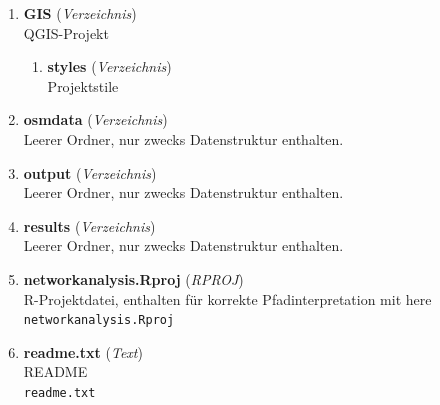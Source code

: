 \begin{enumerate}[label=\arabic*., leftmargin=*, itemsep=0.5em, topsep=0.3em]
\begin{enumerate}[label=\arabic{enumi}.\arabic*, leftmargin=*, itemsep=0.5em, topsep=0.3em]
\texttt{\small geodata/regbez10kmbuffer.geojson}
\item \textbf{regbez25kmbuffer.geojson} \textnormal{(\textit{GeoJSON})}\\
Untersuchungsgebiet mit 25 km Puffer (VG250)\\
\texttt{\small geodata/regbez25kmbuffer.geojson}
\item \textbf{zensus.gpkg} \textnormal{(\textit{GeoPackage})}\\
Zensusgitter (bewohnte Zellen)\\
\texttt{\small geodata/zensus.gpkg}
\begin{enumerate}[label=\arabic{enumi}.\arabic{enumii}.\arabic*, leftmargin=*, itemsep=0.5em, topsep=0.3em]
\item \textbf{regbez\_zensus\_populated} \textnormal{(\textit{Layer})}
\item \textbf{regbez\_zensus\_populated\_25km} \textnormal{(\textit{Layer})}
\end{enumerate}
\end{enumerate}
\item \textbf{GIS} \textnormal{(\textit{Verzeichnis})}\\
QGIS-Projekt
\begin{enumerate}[label=\arabic{enumi}.\arabic*, leftmargin=*, itemsep=0.5em, topsep=0.3em]
\item \textbf{styles} \textnormal{(\textit{Verzeichnis})}\\
Projektstile
\end{enumerate}
\item \textbf{osmdata} \textnormal{(\textit{Verzeichnis})}\\
Leerer Ordner, nur zwecks Datenstruktur enthalten.
\item \textbf{output} \textnormal{(\textit{Verzeichnis})}\\
Leerer Ordner, nur zwecks Datenstruktur enthalten.
\item \textbf{results} \textnormal{(\textit{Verzeichnis})}\\
Leerer Ordner, nur zwecks Datenstruktur enthalten.
\item \textbf{networkanalysis.Rproj} \textnormal{(\textit{RPROJ})}\\
R-Projektdatei, enthalten für korrekte Pfadinterpretation mit here\\
\texttt{\small networkanalysis.Rproj}
\item \textbf{readme.txt} \textnormal{(\textit{Text})}\\
README\\
\texttt{\small readme.txt}
\end{enumerate}
